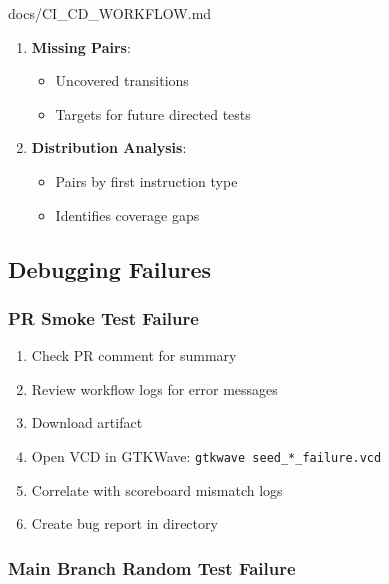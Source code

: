 \begin{relocated}{docs/CI_CD_WORKFLOW.md}
\begin{enumerate}
  \begin{itemize}
  \tightlist
  \item
    Most common transitions
  \item
    Validates realistic code patterns
  \end{itemize}
\item
  \textbf{Missing Pairs}:

  \begin{itemize}
  \tightlist
  \item
    Uncovered transitions
  \item
    Targets for future directed tests
  \end{itemize}
\item
  \textbf{Distribution Analysis}:

  \begin{itemize}
  \tightlist
  \item
    Pairs by first instruction type
  \item
    Identifies coverage gaps
  \end{itemize}
\end{enumerate}

\subsection{Debugging Failures}\label{um:flow:ci-cd-workflow:debugging-failures}

\subsubsection{PR Smoke Test Failure}\label{um:flow:ci-cd-workflow:pr-smoke-test-failure}

\begin{enumerate}
\def\labelenumi{\arabic{enumi}.}
\tightlist
\item
  Check PR comment for summary
\item
  Review workflow logs for error messages
\item
  Download  artifact
\item
  Open VCD in GTKWave:
  \texttt{gtkwave\ seed\_\allowbreak{}*\_\allowbreak{}failure.\allowbreak{}vcd}
\item
  Correlate with scoreboard mismatch logs
\item
  Create bug report in  directory
\end{enumerate}

\subsubsection{Main Branch Random Test Failure}\label{um:flow:ci-cd-workflow:main-branch-random-test-failure}


\end{relocated}

